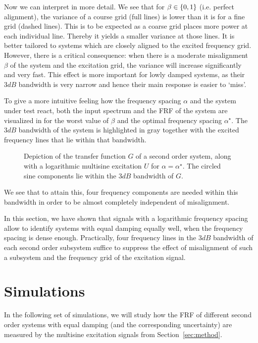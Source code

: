   Now we can interpret  in more detail.
  We see that for $\beta \in \left\{0,1\right\}$ (i.e. perfect alignment), the variance of a course grid (full lines) is lower than it is for a fine grid (dashed lines).
  This is to be expected as a coarse grid places more power at each individual line.
  Thereby it yields a smaller variance at those lines.
  It is better tailored to systems which are closely aligned to the excited frequency grid.
  However, there is a critical consequence: when there is a moderate misalignment $\beta$ of the system and the excitation grid, the variance will increase significantly and very fast.
  This effect is more important for lowly damped systems, as their $3\unit{dB}$ bandwidth is very narrow and hence their main response is easier to `miss'.

  To give a more intuitive feeling how the frequency spacing $\alpha$ and the system under test react, both the input spectrum and the FRF of the system are visualized in  for the worst value of $\beta$ and the optimal frequency spacing $\alpha^{\star}$.
  The $3\unit{dB}$ bandwidth of the system is highlighted in gray together with the excited frequency lines that lie within that bandwidth.

  \begin{figure}%
    \centering
      \setlength\figureheight{4cm}
      \setlength{}
    
    \caption[System with highlighted bandwidth and multisine components.]{Depiction of the transfer function $G$ of a second order system, along with a logarithmic multisine excitation $U$ for $\alpha = \alpha^{\star}$. The circled sine components lie within the $3 \unit{dB}$ bandwidth of $G$.}%
    \label{fig:signalAndSystem}
  \end{figure}

  We see that to attain this, four frequency components are needed within this bandwidth in order to be almost completely independent of misalignment.

  In this section, we have shown that signals with a logarithmic frequency spacing allow to identify systems with equal damping equally well, when the frequency spacing is dense enough.
  Practically, four frequency lines in the $3\unit{dB}$ bandwidth of each second order subsystem suffice to suppress the effect of misalignment of such a subsystem and the frequency grid of the excitation signal.
  
\section{Simulations} \label{sec:simulation}
In the following set of simulations, we will study how the FRF of different second order systems with equal damping (and the corresponding uncertainty) are measured by the multisine excitation signals from Section~\ref{sec:method}.
